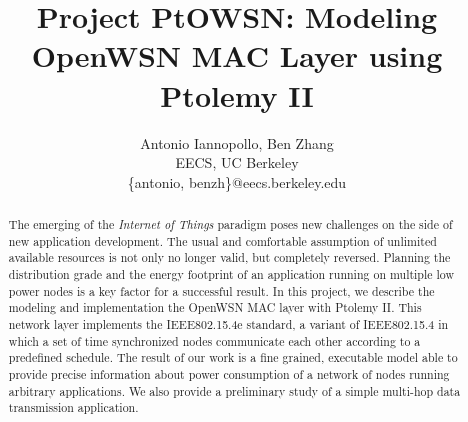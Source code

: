 \documentclass[9pt,twocolumn]{article}
\begin{document}
\title{Project PtOWSN: Modeling OpenWSN MAC Layer using Ptolemy II}

\author{
  Antonio Iannopollo, Ben Zhang\\
  EECS, UC Berkeley\\
  \{antonio, benzh\}@eecs.berkeley.edu
}

\maketitle
\thispagestyle{empty}

\begin{abstract}
The emerging of the {\em Internet of Things} paradigm poses new challenges on the side of new application development. The usual and comfortable assumption of unlimited available resources is not only no longer valid, but completely reversed. Planning the distribution grade and the energy footprint of an application running on multiple low power nodes is a key factor for a successful result.
In this project, we describe the modeling and implementation the OpenWSN MAC layer with Ptolemy II. This network layer implements the IEEE802.15.4e standard, a variant of IEEE802.15.4 in which a set of time synchronized nodes communicate each other according to a predefined schedule. 
The result of our work is a fine grained, executable model able to provide precise information about power consumption of a network of nodes running arbitrary applications. We also provide a preliminary study of a simple multi-hop data transmission application.
\end{abstract}








{\footnotesize }

{\small  }
\end{document}

